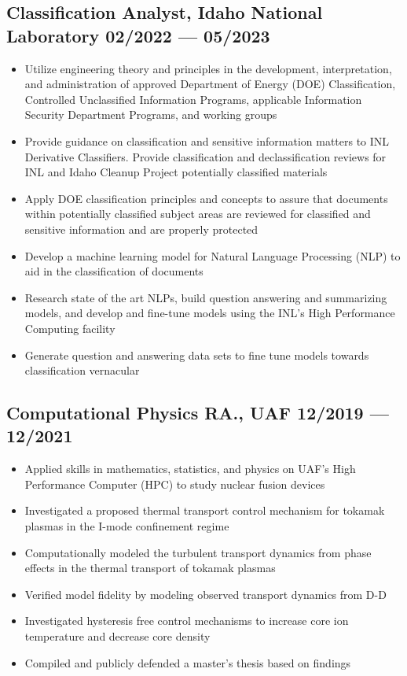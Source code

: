 \documentclass[letterpaper,11pt]{article}
\begin{document}
\subsection*{{\color{cvblue}Classification Analyst, Idaho National Laboratory } \hfill 02/2022 — 05/2023} 
 
\begin{itemize}
    \setlength{\itemsep}{-.5pt}
\item  Utilize engineering theory and principles in the development, interpretation, and administration of approved Department of Energy (DOE) Classification, Controlled Unclassified Information Programs, applicable Information
Security Department Programs, and working groups
\item  Provide guidance on classification and sensitive information matters to INL Derivative Classifiers. Provide classification and declassification reviews for INL and Idaho Cleanup Project potentially classified materials
\item  Apply DOE classification principles and concepts to assure that documents within potentially classified subject areas are reviewed for classified and sensitive information and are properly protected
\item  Develop a machine learning model for Natural Language Processing (NLP) to aid in the classification of documents
\item  Research state of the art NLPs, build question answering and summarizing models, and develop and fine-tune models using the INL’s High Performance Computing facility
\item  Generate question and answering data sets to fine tune models towards classification vernacular
\end{itemize}






\subsection*{{\color{cvblue}Computational Physics RA., UAF } \hfill 12/2019 --- 12/2021} 
    \begin{itemize}
    \setlength{\itemsep}{-.5pt}
    \item Applied skills in mathematics, statistics, and physics on UAF's High Performance Computer (HPC) to study nuclear fusion devices  
\item Investigated a proposed thermal transport control mechanism for tokamak plasmas in the I-mode confinement regime 
\item Computationally modeled the turbulent transport dynamics from phase effects in the thermal transport of tokamak plasmas
\item Verified model fidelity by modeling observed transport dynamics from D-D
\item Investigated hysteresis free control mechanisms to increase core ion temperature and decrease core density 
\item Compiled and publicly defended a master's thesis based on findings
    \end{itemize}
\end{document}
